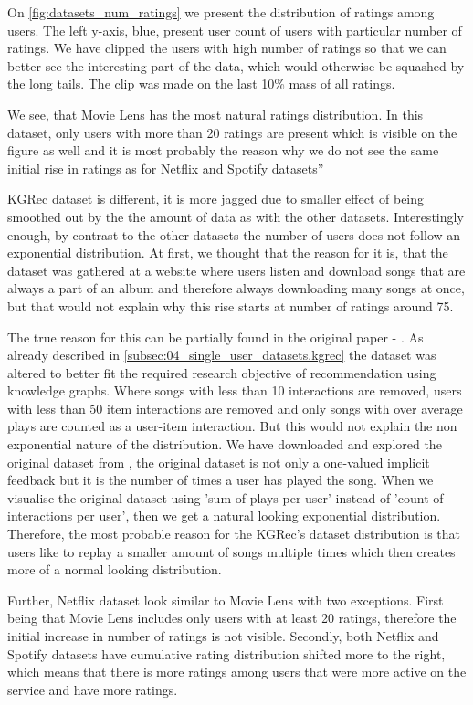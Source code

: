 On \ref{fig:datasets_num_ratings} we present the distribution of ratings among users. The left y-axis, blue, present user count of users with particular number of ratings. We have clipped the users with high number of ratings so that we can better see the interesting part of the data, which would otherwise be squashed by the long tails. The clip was made on the last 10\% mass of all ratings.

We see, that Movie Lens has the most natural ratings distribution. In this dataset, only users with more than 20 ratings are present which is visible on the figure as well and it is most probably the reason why we do not see the same initial rise in ratings as for Netflix and Spotify datasets''

KGRec dataset is different, it is more jagged due to smaller effect of being smoothed out by the the amount of data as with the other datasets. Interestingly enough, by contrast to the other datasets the number of users does not follow an exponential distribution. At first, we thought that the reason for it is, that the dataset was gathered at a website where users listen and download songs that are always a part of an album and therefore always downloading many songs at once, but that would not explain why this rise starts at number of ratings around 75.

The true reason for this can be partially found in the original paper - \cite{kgrec_dataset_origin}. As already described in \ref{subsec:04_single_user_datasets.kgrec} the dataset was altered to better fit the required research objective of recommendation using knowledge graphs. Where songs with less than 10 interactions are removed, users with less than 50 item interactions are removed and only songs with over average plays are counted as a user-item interaction. But this would not explain the non exponential nature of the distribution. We have downloaded and explored the original dataset from \cite{kgrec_dataset_origin_full}, the original dataset is not only a one-valued implicit feedback but it is the number of times a user has played the song. When we visualise the original dataset using 'sum of plays per user' instead of 'count of interactions per user', then we get a natural looking exponential distribution. Therefore, the most probable reason for the KGRec's dataset distribution is that users like to replay a smaller amount of songs multiple times which then creates more of a normal looking distribution.

Further, Netflix dataset look similar to Movie Lens with two exceptions. First being that Movie Lens includes only users with at least 20 ratings, therefore the initial increase in number of ratings is not visible. Secondly, both Netflix and Spotify datasets have cumulative rating distribution shifted more to the right, which means that there is more ratings among users that were more active on the service and have more ratings.




